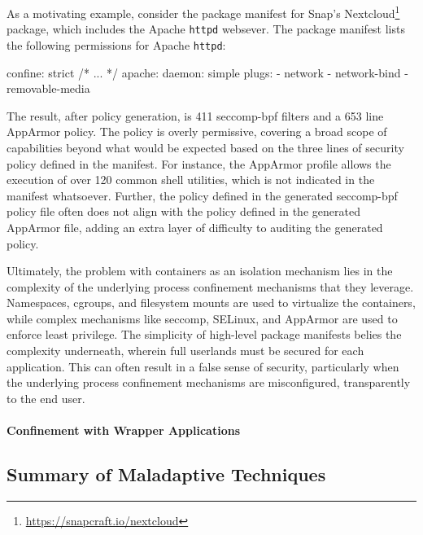 \documentclass[dvipsnames, 12pt]{article}
\begin{document}
As a motivating example, consider the package manifest for Snap's Nextcloud\footnote{\url{https://snapcraft.io/nextcloud}}
package, which includes the Apache \texttt{httpd} websever. The package
manifest lists the following permissions for Apache \texttt{httpd}:

\begin{listing}[language=yaml]
confine: strict
/* ... */
apache:
  daemon: simple
  plugs:
  - network
  - network-bind
  - removable-media
\end{listing}

The result, after policy generation, is 411 seccomp-bpf filters and a 653 line
AppArmor policy. The policy is overly permissive, covering a broad scope of
capabilities beyond what would be expected based on the three lines of security
policy defined in the manifest. For instance, the AppArmor profile allows the
execution of over 120 common shell utilities, which is not indicated in the
manifest whatsoever. Further, the policy defined in the generated seccomp-bpf
policy file often does not align with the policy defined in the generated
AppArmor file, adding an extra layer of difficulty to auditing the generated
policy.

Ultimately, the problem with containers as an isolation mechanism lies in the
complexity of the underlying process confinement mechanisms that they leverage.
Namespaces, cgroups, and filesystem mounts are used to virtualize the
containers, while complex mechanisms like seccomp, SELinux, and AppArmor are
used to enforce least privilege. The simplicity of high-level package manifests
belies the complexity underneath, wherein full userlands must be secured for
each application. This can often result in a false sense of security,
particularly when the underlying process confinement mechanisms are
misconfigured, transparently to the end user.

\paragraph*{Confinement with Wrapper Applications}


\subsection{Summary of Maladaptive Techniques}

\FloatBarrier
\end{document}
